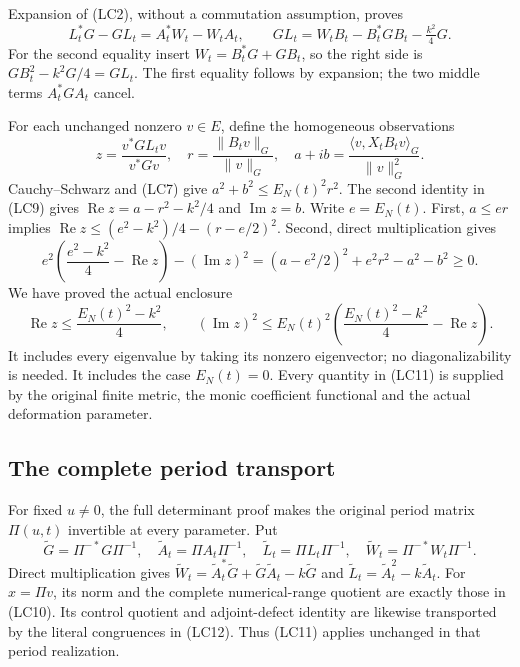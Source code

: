 Expansion of (LC2), without a commutation assumption, proves
\[
 L_t^*G-GL_t=A_t^*W_t-W_tA_t,\qquad
 GL_t=W_tB_t-B_t^*GB_t-\tfrac{k^2}{4}G.
 \tag{LC9}
\]
For the second equality insert
\(W_t=B_t^*G+GB_t\), so the right side is
\(GB_t^2-k^2G/4=GL_t\). The first equality follows by expansion;
the two middle terms \(A_t^*GA_t\) cancel.

For each unchanged nonzero \(v\in E\), define the homogeneous
observations
\[
 z=\frac{v^*GL_tv}{v^*Gv},\quad
 r=\frac{\|B_tv\|_G}{\|v\|_G},\quad
 a+ib=\frac{\langle v,X_tB_tv\rangle_G}{\|v\|_G^2}.
 \tag{LC10}
\]
Cauchy--Schwarz and (LC7) give
\(a^2+b^2\le E_N(t)^2r^2\). The second identity in (LC9) gives
\(\operatorname{Re}z=a-r^2-k^2/4\) and
\(\operatorname{Im}z=b\). Write \(e=E_N(t)\). First,
\(a\le er\) implies
\(\operatorname{Re}z\le(e^2-k^2)/4-(r-e/2)^2\).
Second, direct multiplication gives
\[
 e^2\left(\frac{e^2-k^2}{4}-\operatorname{Re}z\right)
    -(\operatorname{Im}z)^2
   =(a-e^2/2)^2+e^2r^2-a^2-b^2\ge0.
\]
We have proved the actual enclosure
\[
 \boxed{\operatorname{Re}z\le\frac{E_N(t)^2-k^2}{4},\qquad
 (\operatorname{Im}z)^2\le E_N(t)^2
       \left(\frac{E_N(t)^2-k^2}{4}-\operatorname{Re}z\right).}
 \tag{LC11}
\]
It includes every eigenvalue by taking its nonzero eigenvector;
no diagonalizability is needed. It includes the case \(E_N(t)=0\).
Every quantity in (LC11) is supplied by the original finite metric,
the monic coefficient functional and the actual deformation parameter.

\subsection{The complete period transport}

For fixed \(u\ne0\), the full determinant proof makes the original
period matrix \(\Pi(u,t)\) invertible at every parameter. Put
\[
 \widetilde G=\Pi^{-*}G\Pi^{-1},\quad
 \widetilde A_t=\Pi A_t\Pi^{-1},\quad
 \widetilde L_t=\Pi L_t\Pi^{-1},\quad
 \widetilde W_t=\Pi^{-*}W_t\Pi^{-1}.
 \tag{LC12}
\]
Direct multiplication gives
\(\widetilde W_t=\widetilde A_t^*\widetilde G+
\widetilde G\widetilde A_t-k\widetilde G\) and
\(\widetilde L_t=\widetilde A_t^2-k\widetilde A_t\).
For \(x=\Pi v\), its norm and the complete numerical-range quotient
are exactly those in (LC10). Its control quotient and adjoint-defect
identity are likewise transported by the literal congruences in
(LC12). Thus (LC11) applies unchanged in that period realization.

